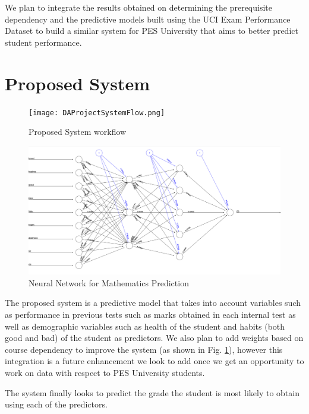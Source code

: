 \documentclass[conference]{IEEEtran}
\begin{document}
We plan to integrate the results obtained on determining the prerequisite dependency and the predictive models built using the UCI Exam Performance Dataset \cite{Lichman:2013}\cite{ref:4} to build a similar system for PES University that aims to better predict student performance.


	\section{Proposed System}
\begin{figure}
	\texttt{[image: DAProjectSystemFlow.png]}
	\caption{Proposed System workflow}
	\label{fig:DAProjectSystemFlow}
\end{figure}
\begin{figure}
	\includegraphics[width=\linewidth]{neural_net_math.png}
	\caption{Neural Network for Mathematics Prediction}
	\label{fig:neural-net}
\end{figure}

The proposed system is a predictive model that takes into account variables such
as performance in previous tests such as marks obtained in each internal test as well as
demographic variables such as health of the student and habits (both good and bad) of
the student as predictors. We also plan to add weights based on course dependency to
improve the system (as shown in Fig. \ref{fig:DAProjectSystemFlow}), however this integration 
is a future enhancement we look to add once we get an opportunity to work on data with respect to
PES University students.

The system finally looks to predict the grade the student is most likely to obtain using
each of the predictors.
\end{document}
